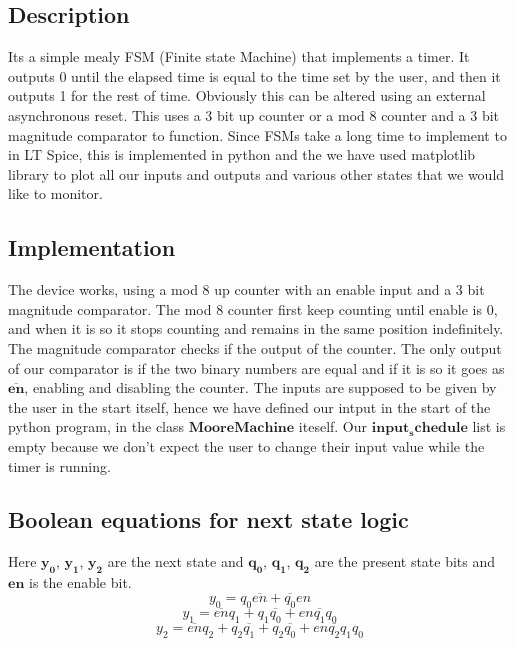 \documentclass[a4paper,10pt]{article}
\begin{document}
\subsection{Description}
Its a simple mealy FSM (Finite state Machine) that implements a timer. It outputs 0 until the elapsed time is equal to the time set by the user, and then it outputs 1 for the rest of time. Obviously this can be altered using an external asynchronous reset. This uses a 3 bit up counter or a mod 8 counter and a 3 bit magnitude comparator to function. Since FSMs take a long time to implement to in LT Spice, this is implemented in python and the we have used matplotlib library to plot all our inputs and outputs and various other states that we would like to monitor.

\subsection{Implementation}
The device works, using a mod 8 up counter with an enable input and a 3 bit magnitude comparator. The mod 8 counter first keep counting until enable is 0, and when it is so it stops counting and remains in the same position indefinitely. The magnitude comparator checks if the output of the counter. The only output of our comparator is if the two binary numbers are equal and if it is so it goes as $\boldsymbol{\overline{en}}$, enabling and disabling the counter. The inputs are supposed to be given by the user in the start itself, hence we have defined our intput in the start of the python program, in the class $\boldsymbol{MooreMachine}$ iteself. Our $\boldsymbol{input_schedule}$ list is empty because we don't expect the user to change their input value while the timer is running.

\subsection{Boolean equations for next state logic}
Here $\boldsymbol{y_0}$, $\boldsymbol{y_1}$, $\boldsymbol{y_2}$ are the next state and $\boldsymbol{q_0}$, $\boldsymbol{q_1}$, $\boldsymbol{q_2}$ are the present state bits and $\boldsymbol{en}$ is the enable bit.\newline
\[y_0 = q_0\overline{en} + \overline{q_0}en\]
\[y_1 = \overline{en}q_1 + q_1\overline{q_0} + en\overline{q_1}q_0\]
\[y_2 = \overline{en}q_2 + q_2\overline{q_1} + q_2\overline{q_0} + en\overline{q_2}q_1q_0\]
\end{document}
